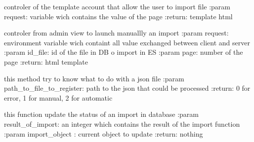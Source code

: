 \documentclass[letterpaper,10pt,english]{sphinxmanual}
\begin{document}

\begin{fulllineitems}
\label{\detokenize{QuChemPedIA.views:QuChemPedIA.views.importView.import_view}}
controler of the template account that allow the user to import file
:param request: variable wich contains the value of the page
:return: template html

\end{fulllineitems}


\begin{fulllineitems}
\label{\detokenize{QuChemPedIA.views:QuChemPedIA.views.importView.launch_import}}
controler from admin view to launch manuallly an import
:param request: environment variable wich containt all value exchanged between client and server
:param id\_file: id of the file in DB o import in ES
:param page: number of the page
:return: html template

\end{fulllineitems}


\begin{fulllineitems}
\label{\detokenize{QuChemPedIA.views:QuChemPedIA.views.importView.register_soft_job_type_and_version}}
this method try to know what to do with a json file
:param path\_to\_file\_to\_register: path to the json that could be processed
:return: 0 for error, 1 for manual, 2 for automatic

\end{fulllineitems}


\begin{fulllineitems}
\label{\detokenize{QuChemPedIA.views:QuChemPedIA.views.importView.update_status_in_db}}
this function update the status of an import in database
:param result\_of\_import: an integer which contains the result of the import function
:param import\_object : current object to update
:return: nothing

\end{fulllineitems}
\end{document}
